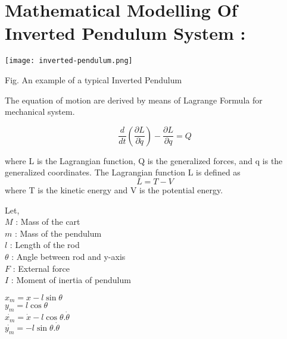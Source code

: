 \documentclass[11pt]{article}
\begin{document}
\section{Mathematical Modelling Of Inverted Pendulum System : }
\begin{center}
    \texttt{[image: inverted-pendulum.png]}
\end{center}
\begin{center}
    Fig. An example of a typical Inverted Pendulum
\end{center}
\begin{flushleft}
{The equation of motion are derived by means of Lagrange Formula for mechanical system. \\
\begin{flushleft}
\begin{equation}
\frac{d}{dt}\left(\frac{\partial L}{\partial \dot{q}}\right)-\frac{\partial L}{\partial q}=Q
\end{equation}
\begin{flushleft}
{where L is the Lagrangian function, Q is the generalized forces, and q is the generalized coordinates. The Lagrangian function L is defined as}
$$L=T-V$$
{where T is the kinetic energy and V is the potential energy.} 
\end{flushleft}
\end{flushleft}
}
\end{flushleft}

\begin{flushleft} 
{
Let, \\
$M$ : Mass of the cart \\
$m$ : Mass of the pendulum \\
$l$ : Length of the rod \\
${\theta }$ : Angle between rod and y-axis \\
$F$ : External force \\
$I$ : Moment of inertia of pendulum
}
\end{flushleft}
\begin{flushleft} {
$x_m = x - l\sin{\theta}$ \\
$y_m = l\cos{\theta}$ \\
$\dot{x_m} = \dot{x} - l\cos{\theta}.\dot{\theta}$ \\
$\dot{y_m} = -l\sin{\theta}.\dot{\theta}$ \\
}
\end{flushleft}
\end{document}
